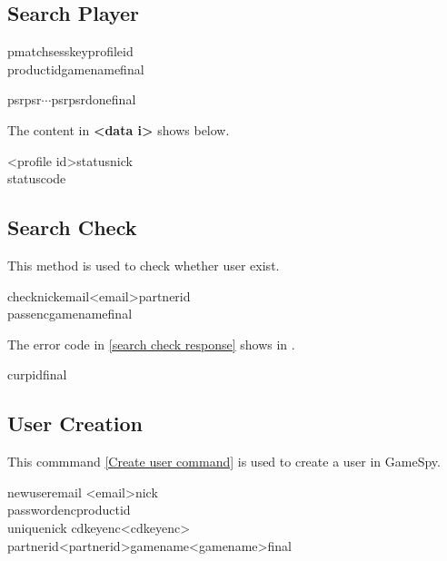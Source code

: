 \documentclass[oneside,titlepage,a4paper]{Definition/retrospy} %
\begin{document}
\subsection{Search Player}

\ClientRequest

\begin{mybox}
	\tbs pmatch\tbs\tbs sesskey\tbs<session key>\tbs profileid\tbs<profile id>\\\tbs productid\tbs <product id>\tbs gamename\tbs <game name>\tbs final\tbs
\end{mybox}

\ServerResponse
\begin{mybox}
	\tbs psr\tbs <data 1>\tbs psr\tbs<data 2>\tbs $\cdots$\tbs psr\tbs <data n>\tbs psrdone\tbs final\tbs
\end{mybox}
The content in \textbf{<data i>} shows below.
\begin{mybox}
	<profile id>\tbs status\tbs<status string>\tbs nick\tbs<nick name>\\\tbs statuscode\tbs<status code>
\end{mybox}


\subsection{Search Check}
This method is used to check whether user exist.
\ClientRequest

\begin{mybox}
	\tbs check\tbs\tbs nick\tbs <nick name>\tbs email\tbs<email>\tbs partnerid\tbs <partner id>\\\tbs passenc\tbs<encrypted password>\tbs gamename\tbs<game name>\tbs final\tbs
\end{mybox}

\ServerResponse
The error code in \ref{search check response} shows in .
\begin{mybox}[label = search check response]
	\tbs cur\tbs<check error code>\tbs pid\tbs <profile id>\tbs final\tbs
\end{mybox}

\subsection{User Creation}
This commmand \ref{Create user command} is used to create a user in GameSpy.
\ClientRequest

\begin{mybox}[label = Create user command]
\tbs newuser\tbs email \tbs <email>\tbs nick \\
\tbs passwordenc\tbs productid\\\tbs uniquenick
\tbs cdkeyenc\tbs <cdkeyenc>\\\tbs partnerid\tbs <partnerid>\tbs gamename\tbs <gamename>\tbs final\tbs
\end{mybox}
\end{document}
